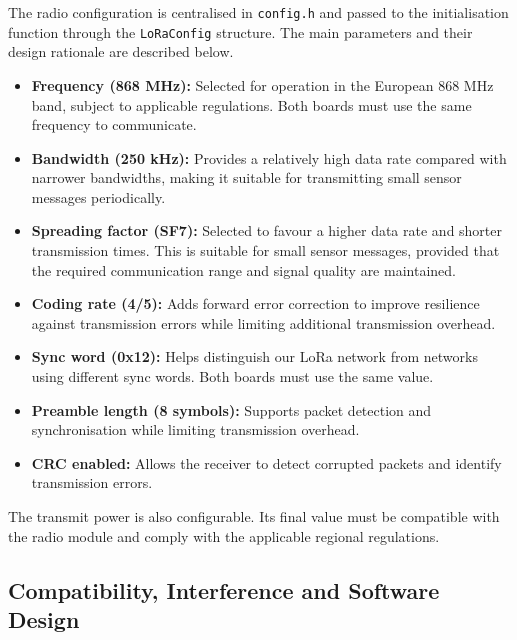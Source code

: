\documentclass[informe,english]{plantilla}
\begin{document}
The radio configuration is centralised in \texttt{config.h} and passed to the initialisation function through the \texttt{LoRaConfig} structure. The main parameters and their design rationale are described below.

\begin{itemize}
    \item \textbf{Frequency (868 MHz):}
    Selected for operation in the European 868 MHz band, subject to applicable regulations. Both boards must use the same frequency to communicate.

    \item \textbf{Bandwidth (250 kHz):}
    Provides a relatively high data rate compared with narrower bandwidths, making it suitable for transmitting small sensor
    messages periodically.

    \item \textbf{Spreading factor (SF7):}
    Selected to favour a higher data rate and shorter transmission times. This is suitable for small sensor messages, provided that the required communication range and signal quality are maintained.

    \item \textbf{Coding rate (4/5):}
    Adds forward error correction to improve resilience against transmission errors while limiting additional transmission overhead.

    \item \textbf{Sync word (0x12):}
    Helps distinguish our LoRa network from networks using different sync words. Both boards must use the same value.

    \item \textbf{Preamble length (8 symbols):}
    Supports packet detection and synchronisation while limiting transmission overhead.

    \item \textbf{CRC enabled:}
    Allows the receiver to detect corrupted packets and identify transmission errors.
\end{itemize}

The transmit power is also configurable. Its final value must be compatible with the radio module and comply with the applicable regional regulations.

\subsection{Compatibility, Interference and Software Design}
\label{sec:lora-software}
\end{document}
